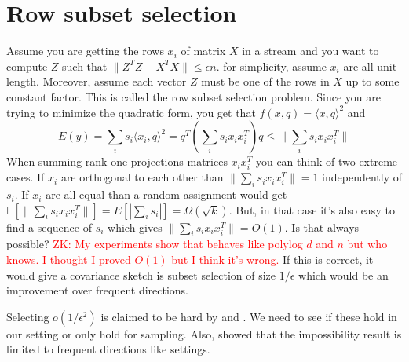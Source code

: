 \documentclass{article} %
\newcommand{\zk}[1]{\textcolor{red}{ZK: #1}}
\newcommand{\E}{\mathbb{E}}
\newcommand{\eps}{\epsilon}
\begin{document}
\section{Row subset selection}
Assume you are getting the rows $x_i$  of matrix $X$ in a stream and you want to compute $Z$ such that $\|Z^TZ - X^TX\| \le \eps n$.
for simplicity, assume $x_i$ are all unit length. Moreover, assume each vector $Z$ must be one of the rows in $X$ up to some constant factor.
This is called the row subset selection problem. 
Since you are trying to minimize the quadratic form, you get that $f(x, q) = \langle x,q \rangle ^2$ and 
$$E(y) = \sum_i s_i \langle x_i,q \rangle ^2 = q^T (\sum_i s_i x_i x_i^T ) q \le \|\sum_i s_i x_i x_i^T\|$$
When summing rank one projections matrices $x_i x_i^T$ you can think of two extreme cases. 
If $x_i$ are orthogonal to each other than $\|\sum_i s_i x_i x_i^T\| = 1$ independently of $s_i$.
If $x_i$ are all equal than a random assignment would get  $\E[\|\sum_i s_i x_i x_i^T\|] = E[|\sum_i s_i|] = \Omega(\sqrt{k})$.
But, in that case it's also easy to find a sequence of $s_i$ which gives $\|\sum_i s_i x_i x_i^T\| = O(1)$. Is that always possible?
\zk{My experiments show that behaves like polylog $d$ and $n$ but who knows. I thought I proved $O(1)$ but I think it's wrong.}
If this is correct, it would give a covariance sketch is subset selection of size $1/\eps$ which would be an improvement over frequent directions.

Selecting $o(1/\eps^2)$ is claimed to be hard by \cite{DBLP:conf/focs/DeshpandeR10} and \cite{DBLP:conf/soda/DeshpandeRVW06}. We need to see if these hold in our setting or only hold for sampling.  Also, \cite{DBLP:conf/soda/GhashamiP14} showed that the impossibility result is limited to frequent directions like settings.




\end{document}

